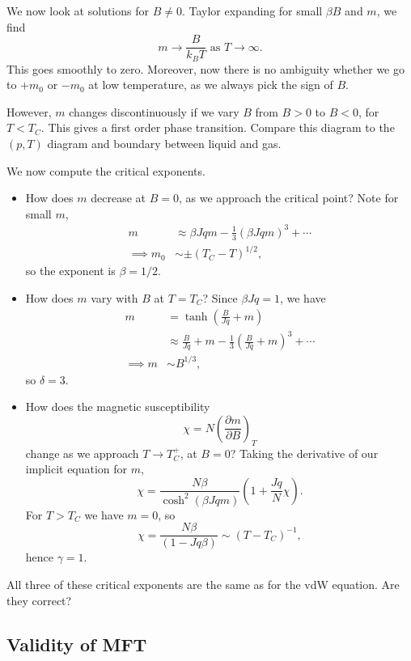 \documentclass[12pt]{article}
\begin{document}
We now look at solutions for $B \neq 0$. Taylor expanding for small $\beta B$ and $m$, we find
\[
	m \to \frac{B}{k_B T}\text{ as } T \to \infty.
\]
This goes smoothly to zero. Moreover, now there is no ambiguity whether we go to $+m_0$ or $-m_0$ at low temperature, as we always pick the sign of $B$.

However, $m$ changes discontinuously if we vary $B$ from $B > 0$ to $B < 0$, for $T < T_C$. This gives a first order phase transition. Compare this diagram to the $(p, T)$ diagram and boundary between liquid and gas.

We now compute the critical exponents.
\begin{itemize}
	\item How does $m$ decrease at $B = 0$, as we approach the critical point? Note for small $m$,
		\begin{align*}
			m &\approx \beta J q m - \frac{1}{3} (\beta J q m)^3 + \cdots \\
			\implies m_0 &\sim \pm (T_C - T)^{1/2},
		\end{align*}
		so the exponent is $\beta = 1/2$.
	\item How does $m$ vary with $B$ at $T = T_C$? Since $\beta J q = 1$, we have
		\begin{align*}
			m &= \tanh \left( \frac{B}{J q} + m\right) \\
			  &\approx \frac{B}{Jq} + m - \frac{1}{3} \left( \frac{B}{Jq} + m \right)^3 + \cdots \\
			\implies m &\sim B^{1/3},
		\end{align*}
		so $\delta = 3$.
	\item How does the magnetic susceptibility
		\[
		\chi = N \left( \frac{\partial m}{\partial B} \right)_T
		\]
		change as we approach $T \to T_C^+$, at $B = 0$? Taking the derivative of our implicit equation for $m$,
		\[
		\chi = \frac{N \beta}{ \cosh^2(\beta J q m )} \left(1 + \frac{Jq}{N} \chi \right).
		\]
		For $T > T_C$ we have $m = 0$, so
		\[
		\chi = \frac{N \beta}{(1 - J q \beta)} \sim (T - T_C)^{-1},
		\]
		hence $\gamma = 1$.
\end{itemize}

All three of these critical exponents are the same as for the vdW equation. Are they correct?

\subsection{Validity of MFT}
\label{sub:valid}
\end{document}
